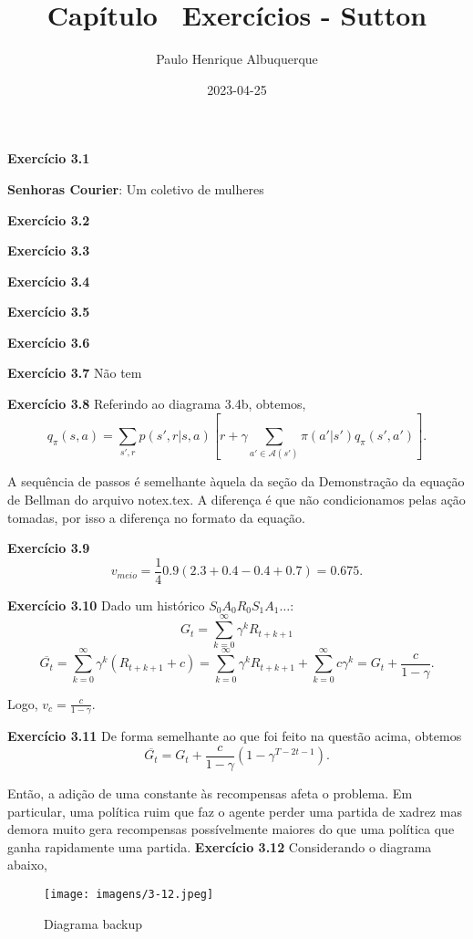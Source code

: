 \documentclass{article}
\title{Capítulo \cha\ Exercícios   - Sutton}
\author{Paulo Henrique Albuquerque}
\date{2023-04-25}
\begin{document}
\maketitle

\textbf{Exercício 3.1} 

\textbf{Senhoras Courier}: Um coletivo de mulheres
\vspace{5mm}

\textbf{Exercício 3.2} 
\vspace{5mm}

\textbf{Exercício 3.3} 
\vspace{5mm}

\textbf{Exercício 3.4} 
\vspace{5mm}

\textbf{Exercício 3.5} 
\vspace{5mm}

\textbf{Exercício 3.6} 
\vspace{5mm}

\textbf{Exercício 3.7} 
 Não tem
\vspace{5mm}

\textbf{Exercício 3.8} Referindo ao diagrama 3.4b, obtemos,
\[
  q_{\pi}(s,a) = \sum_{s',r}^{} p(s',r|s,a)[r+\gamma \sum_{a' \in \mathcal{A}(s')}^{} \pi(a'|s') q_{\pi}(s',a')]
.\] 

A sequência de passos é semelhante àquela da seção da Demonstração da equação de Bellman do arquivo notex.tex. A diferença é que não condicionamos pelas ação tomadas, por isso a diferença no formato da equação.

\vspace{5mm}


\textbf{Exercício 3.9} \[
  v_{meio}=\frac{1}{4}0.9(2.3+0.4-0.4+0.7)=0.675
.\] 
\vspace{5mm}

\textbf{Exercício 3.10} Dado um histórico $S_0A_0R_0S_1A_1\ldots$:
\[
  G_t=\sum_{k=0}^{\infty} {\gamma}^k R_{t+k+1}
\]
\[
  \overline{G_t} = \sum_{k=0}^{\infty} {\gamma}^{k} (R_{t+k+1}+c)=\sum_{k=0}^{\infty} {\gamma}^k R_{t+k+1} + \sum_{k=0}^{\infty} c{\gamma}^k = G_t + \frac{c}{1-\gamma}
.\] 

Logo, $v_c = \frac{c}{1-\gamma}$.

\textbf{Exercício 3.11} De forma semelhante ao que foi feito na questão acima, obtemos
\[
  \overline{G_t} = G_t + \frac{c}{1-\gamma}(1-{\gamma}^{T-2t-1})
.\]

Então, a adição de uma constante às recompensas afeta o problema. Em particular, uma política ruim que faz o agente perder uma partida de xadrez mas demora muito gera recompensas possívelmente maiores do que uma política que ganha rapidamente uma partida.
\vspace{5mm}
\newpage
\textbf{Exercício 3.12} Considerando o diagrama abaixo,
\begin{figure}[htpb]
  \centering
  \texttt{[image: imagens/3-12.jpeg]}
  \caption{Diagrama backup}
  \label{fig:imagens-3-12-jpeg}
\end{figure}
\end{document}

